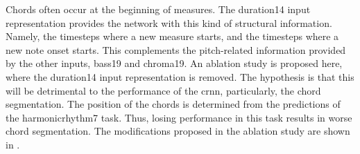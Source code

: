 
Chords often occur at the beginning of measures. The
\gls{duration14} input representation provides the network
with this kind of structural information. Namely, the
timesteps where a new measure starts, and the timesteps
where a new note onset starts. This complements the
pitch-related information provided by the other inputs,
\gls{bass19} and \gls{chroma19}. An ablation study is
proposed here, where the \gls{duration14} input
representation is removed. The hypothesis is that this will
be detrimental to the performance of the \gls{crnn},
particularly, the chord segmentation. The position of the
chords is determined from the predictions of the
\gls{harmonicrhythm7} task. Thus, losing performance in this
task results in worse chord segmentation. The modifications
proposed in the ablation study are shown in
.

